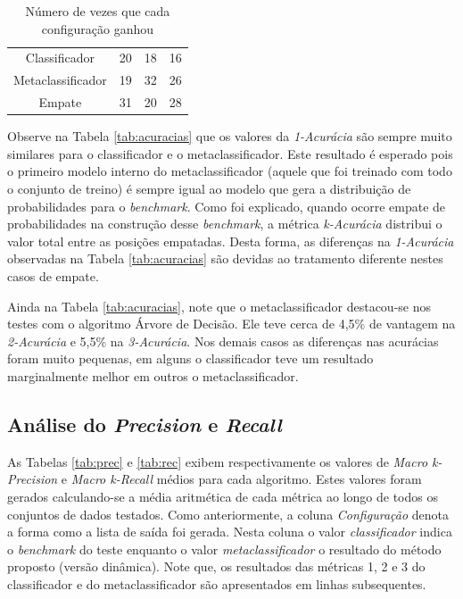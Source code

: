 {\begin{table}[h!]
\begin{center}
\begin{tabular}{cccc}
Classificador	&	20	&	18	&	16	\\
Metaclassificador	&	19	&	32	&	26	\\
Empate	&	31	&	20	&	28	\\

      \hline
    \end{tabular}
    \caption{Número de vezes que cada configuração ganhou}
    \label{tab:acuracias2}
  \end{center}
\end{table}

Observe na Tabela \ref{tab:acuracias} que os valores da \textit{1-Acurácia} são sempre muito similares para o classificador e o metaclassificador.
Este resultado é esperado pois o primeiro modelo interno do metaclassificador (aquele que foi treinado com todo o conjunto de treino) é sempre igual ao modelo que gera a distribuição de probabilidades para o \textit{benchmark}.
Como foi explicado, quando ocorre empate de probabilidades na construção desse \textit{benchmark}, a métrica \textit{k-Acurácia} distribui o valor total entre as posições empatadas.
Desta forma, as diferenças na \textit{1-Acurácia} observadas na Tabela \ref{tab:acuracias} são devidas ao tratamento diferente nestes casos de empate.

Ainda na Tabela \ref{tab:acuracias}, note que o metaclassificador destacou-se nos testes com o algoritmo Árvore de Decisão.
Ele teve cerca de 4,5\% de vantagem na \textit{2-Acurácia} e 5,5\% na \textit{3-Acurácia}.
Nos demais casos as diferenças nas acurácias foram muito pequenas, em alguns o classificador teve um resultado marginalmente melhor em outros o metaclassificador.

\subsection{Análise do \textit{Precision} e \textit{Recall}}

As Tabelas \ref{tab:prec} e \ref{tab:rec} exibem respectivamente os valores de \textit{Macro k-Precision} e \textit{Macro k-Recall} médios para cada algoritmo.
Estes valores foram gerados calculando-se a média aritmética de cada métrica ao longo de todos os conjuntos de dados testados.
Como anteriormente, a coluna \textit{Configuração} denota a forma como a lista de saída foi gerada. 
Nesta coluna o valor \textit{classificador} indica o \textit{benchmark} do teste enquanto o valor \textit{metaclassificador} o resultado do método proposto (versão dinâmica).
Note que, os resultados das métricas 1, 2 e 3 do classificador e do metaclassificador são apresentados em linhas subsequentes.

}
